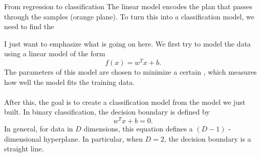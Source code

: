 \begin{parag}{From regression to classification}
The linear model encodes the plan that passes through the samples (orange plane). To turn this into a classification model, we need to find the 
\begin{framedremark}
I just want to emphasize what is going on here. 
We first try to model the data using a linear model of the form 
\[
f(x)=w^Tx+b .
\]
The parameters of this model are chosen to minimize a certain 
, which measures how well the model fits the training data.
\\
$ $\\
After this, the goal is to create a classification model from the model we just built.
In binary classification, the decision boundary is defined by
\[
w^Tx+b=0 .
\]
In general, for data in $D$ dimensions, this equation defines a 
$(D-1)$ -dimensional hyperplane. In particular, when $D=2$, the decision 
boundary is a straight line.
\end{framedremark}
\end{parag}



